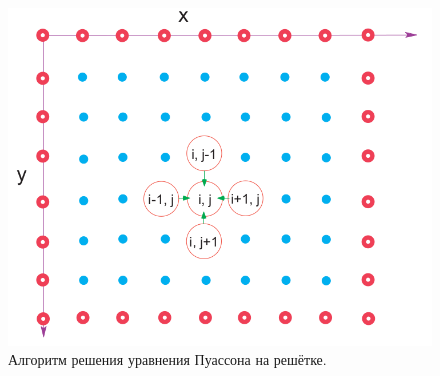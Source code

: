 \documentclass[12pt]{article}
\begin{document}
\begin{figure}
\begin{center}
\includegraphics[width=0.5\linewidth]{./figs/03.png}
\end{center}
\caption{Алгоритм решения уравнения Пуассона на решётке.}
\label{fig:algorithm}
\end{figure}
\end{document}
